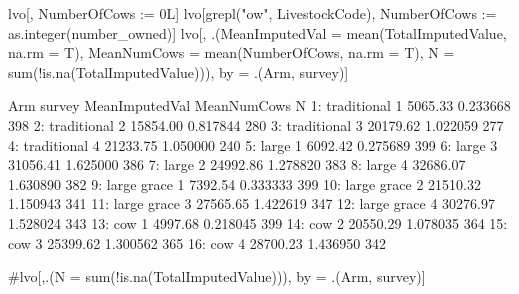 \begin{Schunk}
\begin{Sinput}
lvo[, NumberOfCows := 0L]
lvo[grepl("ow", LivestockCode), NumberOfCows := as.integer(number_owned)]
lvo[,
  .(MeanImputedVal = mean(TotalImputedValue, na.rm = T), 
  MeanNumCows = mean(NumberOfCows, na.rm = T), 
  N = sum(!is.na(TotalImputedValue))), by = .(Arm, survey)]
\end{Sinput}
\begin{Soutput}
            Arm survey MeanImputedVal MeanNumCows   N
 1: traditional      1        5065.33    0.233668 398
 2: traditional      2       15854.00    0.817844 280
 3: traditional      3       20179.62    1.022059 277
 4: traditional      4       21233.75    1.050000 240
 5:       large      1        6092.42    0.275689 399
 6:       large      3       31056.41    1.625000 386
 7:       large      2       24992.86    1.278820 383
 8:       large      4       32686.07    1.630890 382
 9: large grace      1        7392.54    0.333333 399
10: large grace      2       21510.32    1.150943 341
11: large grace      3       27565.65    1.422619 347
12: large grace      4       30276.97    1.528024 343
13:         cow      1        4997.68    0.218045 399
14:         cow      2       20550.29    1.078035 364
15:         cow      3       25399.62    1.300562 365
16:         cow      4       28700.23    1.436950 342
\end{Soutput}
\begin{Sinput}
#lvo[,.(N = sum(!is.na(TotalImputedValue))), by = .(Arm, survey)]
\end{Sinput}
\end{Schunk}
